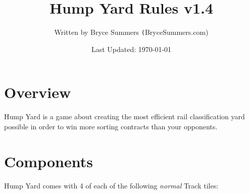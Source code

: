 \documentclass[12pt, letterpaper]{article}
\begin{document}
\title{\color{blue}Hump Yard Rules v1.4}
\author{Written by Bryce Summers \texttt(BryceSummers.com)}
\date{\color{red}Last Updated: \today}
\maketitle

\tableofcontents 

\section{Overview}

Hump Yard is a game about creating the most efficient rail classification yard possible in order to win more sorting contracts than your opponents.

\newpage
\section{Components}

Hump Yard comes with 4 of each of the following \textit{normal} Track tiles:
\end{document}
